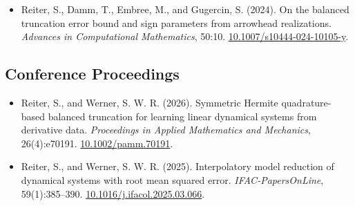 \documentclass[10pt,a4paper,sans]{moderncv}        %
\begin{document}
\begin{itemize}
    \item Reiter, S., Damm, T., Embree, M., and Gugercin, S. (2024). On the balanced truncation error
        bound and sign parameters from arrowhead realizations. \textit{Advances in Computational Mathematics}, 50:10. \url{10.1007/s10444-024-10105-y}. %
\end{itemize}

\vspace{5pt}
\subsection{Conference Proceedings}
\vspace{5pt}
\begin{itemize}
    \item Reiter, S., and Werner, S. W. R. (2026). Symmetric Hermite quadrature-based balanced truncation for learning linear dynamical systems from derivative data. \textit{Proceedings in Applied Mathematics and Mechanics}, 26(4):e70191. \url{10.1002/pamm.70191}.
    \vspace{2pt}

    \item Reiter, S., and Werner, S. W. R. (2025). Interpolatory model reduction of dynamical systems with root mean squared error. \textit{IFAC-PapersOnLine}, 59(1):385--390. \url{10.1016/j.ifacol.2025.03.066}. %
\end{itemize}

\end{document}
